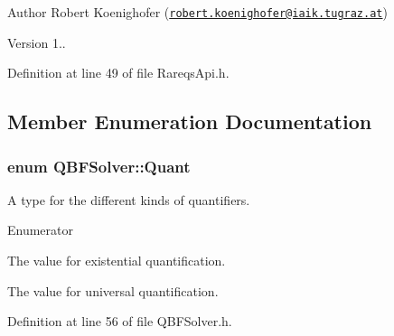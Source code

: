 \begin{DoxyAuthor}{Author}
Robert Koenighofer (\href{mailto:robert.koenighofer@iaik.tugraz.at}{\tt robert.\-koenighofer@iaik.\-tugraz.\-at}) 
\end{DoxyAuthor}
\begin{DoxyVersion}{Version}
1.. 
\end{DoxyVersion}


Definition at line 49 of file Rareqs\-Api.\-h.



\subsection{Member Enumeration Documentation}
\hypertarget{classQBFSolver_ac091e263cb55286cc07b2451bcf4d3c7}{
\subsubsection[{Quant}]{\setlength{\rightskip}{0pt plus 5cm}enum {\bf Q\-B\-F\-Solver\-::\-Quant}\hspace{0.3cm}{\ttfamily [inherited]}}}\label{classQBFSolver_ac091e263cb55286cc07b2451bcf4d3c7}


A type for the different kinds of quantifiers. 

\begin{Desc}
\item[Enumerator]\par
\begin{description}
\item[{\em 
\hypertarget{classQBFSolver_ac091e263cb55286cc07b2451bcf4d3c7a090ab4a5b262710ccd80e97d72f9a7b3}{E}\label{classQBFSolver_ac091e263cb55286cc07b2451bcf4d3c7a090ab4a5b262710ccd80e97d72f9a7b3}
}]The value for existential quantification. \item[{\em 
\hypertarget{classQBFSolver_ac091e263cb55286cc07b2451bcf4d3c7afd6518d5d985aa8346ac071e4c0d8ee0}{A}\label{classQBFSolver_ac091e263cb55286cc07b2451bcf4d3c7afd6518d5d985aa8346ac071e4c0d8ee0}
}]The value for universal quantification. \end{description}
\end{Desc}


Definition at line 56 of file Q\-B\-F\-Solver.\-h.



